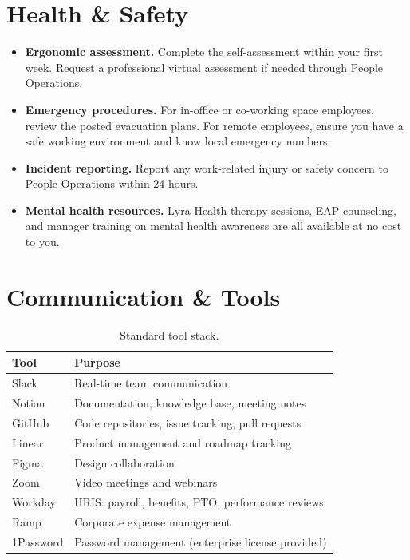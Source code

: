 \documentclass[
    language=english,
    doctype=employee-handbook,
    institution=none,
]{../../omnilatex}
\begin{document}
\section{Health \& Safety}

\begin{itemize}
    \item \textbf{Ergonomic assessment.} Complete the self-assessment within
          your first week. Request a professional virtual assessment if
          needed through People Operations.
    \item \textbf{Emergency procedures.} For in-office or co-working space
          employees, review the posted evacuation plans. For remote employees,
          ensure you have a safe working environment and know local emergency
          numbers.
    \item \textbf{Incident reporting.} Report any work-related injury or
          safety concern to People Operations within 24 hours.
    \item \textbf{Mental health resources.} Lyra Health therapy sessions,
          EAP counseling, and manager training on mental health awareness
          are all available at no cost to you.
\end{itemize}

\section{Communication \& Tools}

\begin{table}[h]
    \centering
    \begin{tabular}{ll}
        \toprule
        \textbf{Tool} & \textbf{Purpose} \\
        \midrule
        Slack           & Real-time team communication \\
        Notion          & Documentation, knowledge base, meeting notes \\
        GitHub          & Code repositories, issue tracking, pull requests \\
        Linear          & Product management and roadmap tracking \\
        Figma           & Design collaboration \\
        Zoom            & Video meetings and webinars \\
        Workday         & HRIS: payroll, benefits, PTO, performance reviews \\
        Ramp            & Corporate expense management \\
        1Password       & Password management (enterprise license provided) \\
        \bottomrule
    \end{tabular}
    \caption{Standard tool stack.}
\end{table}
\end{document}
